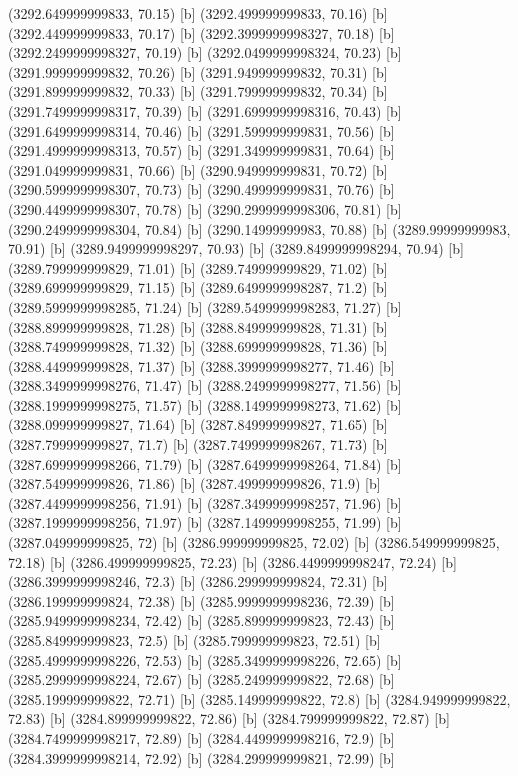 {{{(3292.649999999833, 70.15) [b] 
(3292.499999999833, 70.16) [b] 
(3292.449999999833, 70.17) [b] 
(3292.3999999998327, 70.18) [b] 
(3292.2499999998327, 70.19) [b] 
(3292.0499999998324, 70.23) [b] 
(3291.999999999832, 70.26) [b] 
(3291.949999999832, 70.31) [b] 
(3291.899999999832, 70.33) [b] 
(3291.799999999832, 70.34) [b] 
(3291.7499999998317, 70.39) [b] 
(3291.6999999998316, 70.43) [b] 
(3291.6499999998314, 70.46) [b] 
(3291.599999999831, 70.56) [b] 
(3291.4999999998313, 70.57) [b] 
(3291.349999999831, 70.64) [b] 
(3291.049999999831, 70.66) [b] 
(3290.949999999831, 70.72) [b] 
(3290.5999999998307, 70.73) [b] 
(3290.499999999831, 70.76) [b] 
(3290.4499999998307, 70.78) [b] 
(3290.2999999998306, 70.81) [b] 
(3290.2499999998304, 70.84) [b] 
(3290.14999999983, 70.88) [b] 
(3289.99999999983, 70.91) [b] 
(3289.9499999998297, 70.93) [b] 
(3289.8499999998294, 70.94) [b] 
(3289.799999999829, 71.01) [b] 
(3289.749999999829, 71.02) [b] 
(3289.699999999829, 71.15) [b] 
(3289.6499999998287, 71.2) [b] 
(3289.5999999998285, 71.24) [b] 
(3289.5499999998283, 71.27) [b] 
(3288.899999999828, 71.28) [b] 
(3288.849999999828, 71.31) [b] 
(3288.749999999828, 71.32) [b] 
(3288.699999999828, 71.36) [b] 
(3288.449999999828, 71.37) [b] 
(3288.3999999998277, 71.46) [b] 
(3288.3499999998276, 71.47) [b] 
(3288.2499999998277, 71.56) [b] 
(3288.1999999998275, 71.57) [b] 
(3288.1499999998273, 71.62) [b] 
(3288.099999999827, 71.64) [b] 
(3287.849999999827, 71.65) [b] 
(3287.799999999827, 71.7) [b] 
(3287.7499999998267, 71.73) [b] 
(3287.6999999998266, 71.79) [b] 
(3287.6499999998264, 71.84) [b] 
(3287.549999999826, 71.86) [b] 
(3287.499999999826, 71.9) [b] 
(3287.4499999998256, 71.91) [b] 
(3287.3499999998257, 71.96) [b] 
(3287.1999999998256, 71.97) [b] 
(3287.1499999998255, 71.99) [b] 
(3287.049999999825, 72) [b] 
(3286.999999999825, 72.02) [b] 
(3286.549999999825, 72.18) [b] 
(3286.499999999825, 72.23) [b] 
(3286.4499999998247, 72.24) [b] 
(3286.3999999998246, 72.3) [b] 
(3286.299999999824, 72.31) [b] 
(3286.199999999824, 72.38) [b] 
(3285.9999999998236, 72.39) [b] 
(3285.9499999998234, 72.42) [b] 
(3285.899999999823, 72.43) [b] 
(3285.849999999823, 72.5) [b] 
(3285.799999999823, 72.51) [b] 
(3285.4999999998226, 72.53) [b] 
(3285.3499999998226, 72.65) [b] 
(3285.2999999998224, 72.67) [b] 
(3285.249999999822, 72.68) [b] 
(3285.199999999822, 72.71) [b] 
(3285.149999999822, 72.8) [b] 
(3284.949999999822, 72.83) [b] 
(3284.899999999822, 72.86) [b] 
(3284.799999999822, 72.87) [b] 
(3284.7499999998217, 72.89) [b] 
(3284.4499999998216, 72.9) [b] 
(3284.3999999998214, 72.92) [b] 
(3284.299999999821, 72.99) [b] 
}}}
